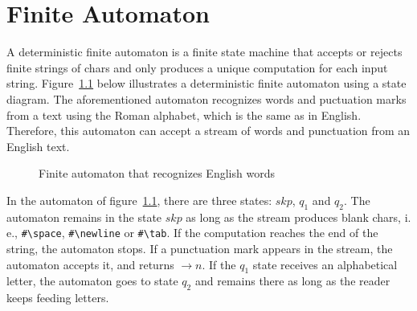 \documentclass[a4paper,12pt]{book}
\begin{document}
\chapter{Finite Automaton}
\label{chap:finite-automaton}
A deterministic finite automaton
is a finite state machine that accepts or rejects
finite strings of chars and only produces
a unique computation  for each input string.
Figure~\ref{fig:automaton} below illustrates a deterministic
finite automaton using a state diagram.
The aforementioned automaton recognizes words
and puctuation marks from a text using
the Roman alphabet, which is the same
as in English. Therefore,
this automaton can  accept a
stream of words and punctuation from an English text.

\begin{figure}[!h]
\renewcommand\figurename{Fig.}
\caption{Finite automaton that recognizes English words}
\label{fig:automaton}
\end{figure}

In the automaton of figure~\ref{fig:automaton}, there
are three states: $skp$, $q_1$ and $q_2$.
The automaton remains in the state $skp$ as long as
the stream produces blank chars, i. e., \verb|#\space|,
\verb|#\newline| or \verb|#\tab|. If the computation
reaches the end of the string, the automaton  stops.
If a punctuation mark appears
in the stream, the automaton accepts it, and 
returns $\rightarrow n$. If the  $q_1$ state
receives an alphabetical letter, the automaton
goes to state $q_2$ and remains there 
as long as the reader keeps feeding letters.
\end{document}
